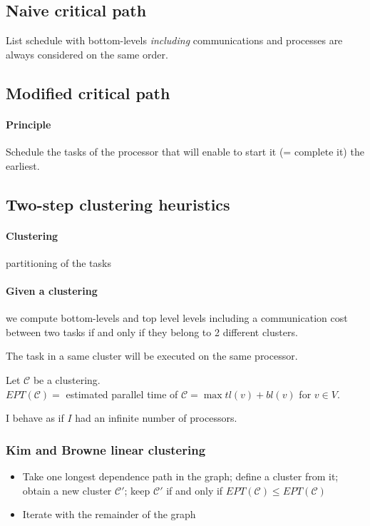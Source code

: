 \documentclass{article}
\begin{document}
\subsection{Naive critical path}
List schedule with bottom-levels \emph{including} communications and processes are always considered on the same order.


\subsection{Modified critical path}
\paragraph{Principle}
Schedule the tasks of the processor that will enable to start it (= complete it) the earliest.


\subsection{Two-step clustering heuristics}
\paragraph{Clustering}
partitioning of the tasks

\paragraph{Given a clustering}
we compute bottom-levels and top level levels including a communication cost between two tasks if and only if they belong to 2 different clusters.

The task in a same cluster will be executed on the same processor.

Let $\mathcal{C}$ be a clustering.\\
$EPT(\mathcal{C})=$ estimated parallel time of $\mathcal{C}=\max tl(v) + bl(v)$ for $v\in V$.

I behave as if $I$ had an infinite number of processors.

\subsubsection*{Kim and Browne linear clustering}
\begin{itemize}
\item Take one longest dependence path in the graph; define a cluster from it; obtain a new cluster $\mathcal{C}'$; keep $\mathcal{C}'$ if and only if $EPT(\mathcal{C})\leq EPT(\mathcal{C})$
\item Iterate with the remainder of the graph
\end{itemize}
\end{document}
